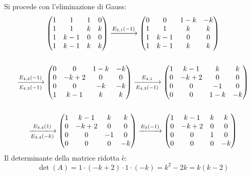 \documentclass[a4paper]{article}
\begin{document}
	\noindent
	Si procede con l'eliminazione di Gauss:
	\begin{gather*}
		\begin{pmatrix}
			1 &	1	& 1 & 0 \\
			1 &	1	& k & k \\
			1 &	k-1	& 0 & 0 \\
			1 &	k-1	& k & k 
		\end{pmatrix}
		\xlongrightarrow{E_{2,1}\left(-1\right)}
		\begin{pmatrix}
			0 &	0	& 1-k & -k \\
			1 &	1	& k & k \\
			1 &	k-1	& 0 & 0 \\
			1 &	k-1	& k & k 
		\end{pmatrix} \\
		\\
		\xlongrightarrow[E_{4,3}\left(-1\right)]{E_{4,2}\left(-1\right)}
		\begin{pmatrix}
			0 &	0	& 1-k & -k \\
			0 &	-k+2 & 0 & 0 \\
			0 &	0	& -k & -k \\
			1 &	k-1	& k & k 
		\end{pmatrix}
		\xlongrightarrow[E_{4,3}\left(-1\right)]{E_{4,1}}
		\begin{pmatrix}
			1 &	k-1	& k & k \\
			0 &	-k+2 & 0 & 0 \\
			0 &	0	& -1 & 0 \\
			0 &	0	& 1-k & -k 
		\end{pmatrix}\\
		\\
		\xlongrightarrow[E_{3,4}\left(-k\right)]{E_{3,4}\left(1\right)}
		\begin{pmatrix}
			1 &	k-1	& k & k \\
			0 &	-k+2 & 0 & 0 \\
			0 &	0	& -1 & 0 \\
			0 &	0	&  0 & -k 
		\end{pmatrix}
		\xrightarrow{E_{3}\left(-1\right)}
		\begin{pmatrix}
			1 &	k-1	& k & k \\
			0 &	-k+2 & 0 & 0 \\
			0 &	0	& 1 & 0 \\
			0 &	0	&  0 & -k 
		\end{pmatrix}
	\end{gather*}
	Il determinante della matrice ridotta è:
	\begin{equation*}
		\det\left(A\right) = 1 \cdot \left(-k+2\right) \cdot 1 \cdot \left(-k\right) = k^{2} - 2k = k\left(k-2\right)
	\end{equation*}
\end{document}
